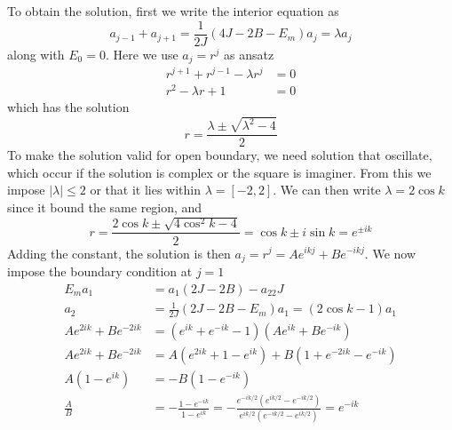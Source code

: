 \documentclass[../../../main.tex]{subfiles}
\begin{document}
To obtain the solution, first we write the interior equation as
\begin{equation*}
    a_{j-1} + a_{j+1} = \frac{1 }{2J} \left( 4J -2B - E_m \right) a_j  = \lambda a_j
\end{equation*}
along with $E_0 = 0$.
Here we use $a_j=r^j$ as ansatz
\begin{align*}
    r ^{j+1 } + r ^{j-1} -\lambda r ^{j} & =  0 \\
    r^2 -\lambda r +1                    & =  0
\end{align*}
which has the solution
\begin{equation*}
    r = \frac{\lambda \pm \sqrt{\lambda^2 -4 } }{2 }
\end{equation*}
To make the solution valid for open boundary, we need solution that oscillate, which occur if the solution is complex or the square is imaginer.
From this we impose $|\lambda|\leq 2$ or that it lies within $\lambda = [-2,2]$.
We can then write $\lambda=2 \cos k$ since it bound the same region, and
\begin{equation*}
    r = \frac{2 \cos k \pm \sqrt{4 \cos ^2 k -4 } }{2 } = \cos k \pm i \sin k = e^{\pm ik}
\end{equation*}
Adding the constant, the solution is then $a_j = r^j =A e ^{ikj }+B e^{-ikj}$.
We now impose the boundary condition at $j=1$
\begin{align*}
    E_m a_1                 & = a_1 (2J-2B) -a_22J                                                                                                                                              \\
    a_2                     & = \frac{1 }{2J} \left( 2J- 2B -E_m  \right) a_1 = (2 \cos  k -1)a_1                                                                                               \\
    Ae ^{2ik } +B e ^{-2ik} & =  (e ^{ik } + e ^{-ik}-1) (Ae ^{ik } +B e ^{-ik})                                                                                                                \\
    Ae ^{2ik } +B e ^{-2ik} & = A(e ^{2ik } + 1 - e ^{ik}) + B(1+ e ^{-2ik } - e ^{-ik})                                                                                                        \\
    A(1-e ^{ik })           & = - B(1 - e^{-ik})                                                                                                                                                \\
    \frac{A }{B}            & =  - \frac{1- e ^{-ik } }{1- e ^{ik } } = - \frac{e ^{-ik/2 } \left( e ^{ik/2 }-e ^{-ik/2} \right) }{e ^{ik/2 } \left( e ^{-ik/2 }-e ^{ik/2} \right) } = e ^{-ik}
\end{align*}
\end{document}
